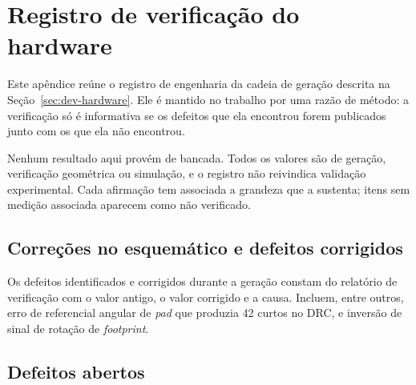 
\chapter{Registro de verificação do hardware}
\label{ape:hardware}

Este apêndice reúne o registro de engenharia da cadeia de geração descrita na
Seção~\ref{sec:dev-hardware}. Ele é mantido no trabalho por uma razão de método: a
verificação só é informativa se os defeitos que ela encontrou forem publicados junto com os
que ela não encontrou.

Nenhum resultado aqui provém de bancada. Todos os valores são de geração, verificação
geométrica ou simulação, e o registro não reivindica validação experimental. Cada afirmação
tem associada a grandeza que a sustenta; itens sem medição associada aparecem como
\textsf{não verificado}.

\section{Correções no esquemático e defeitos corrigidos}
\label{sec:ape-corrigidos}

Os defeitos identificados e corrigidos durante a geração constam do relatório de
verificação com o valor antigo, o valor corrigido e a causa. Incluem, entre outros, erro de
referencial angular de \emph{pad} que produzia \num{42} curtos no DRC, e inversão de sinal
de rotação de \emph{footprint}.

\section{Defeitos abertos}
\label{sec:ape-abertos}


